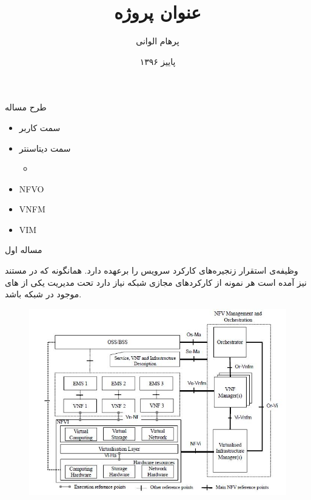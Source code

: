 \documentclass{beamer}
\title{
	عنوان پروژه
}
\subtitle{}
\author{پرهام الوانی}
\institute{دانشکده مهندسی کامپیوتر و فناوری اطلاعات}
\date{پاییز ۱۳۹۶}
\makeatletter
\newcommand{\RTList}{\raggedleft\rightskip\@totalleftmargin}
\makeatother
\begin{document}
\begin{persian}
\begin{frame}
\maketitle
\end{frame}

\everypar{\rightskip\rightmargin}
\begin{frame}{طرح مساله}
	\begin{itemize}\RTList
		\item سمت کاربر
		\item سمت دیتاسنتر
		\begin{itemize}\RTList
			\item {}
		\end{itemize}
	\end{itemize}
\end{frame}
\begin{frame}
	\begin{latin}
		\begin{itemize}
			\item NFVO
			\item VNFM
			\item VIM
		\end{itemize}
	\end{latin}
\end{frame}
\begin{frame}{مساله اول}
	\par
	 وظیفه‌ی استقرار زنجیره‌های کارکرد سرویس را برعهده دارد.
	همانگونه که در مستند  نیز آمده است هر نمونه از کارکردهای مجازی شبکه نیاز دارد
	تحت مدیریت یکی از های موجود در شبکه باشد.
\end{frame}
\begin{frame}
	\begin{center}\begin{figure}
		\includegraphics[scale=0.4]{images/nfv-arch.jpg}

\end{figure}
\end{center}
\end{frame}
\end{persian}
\end{document}
